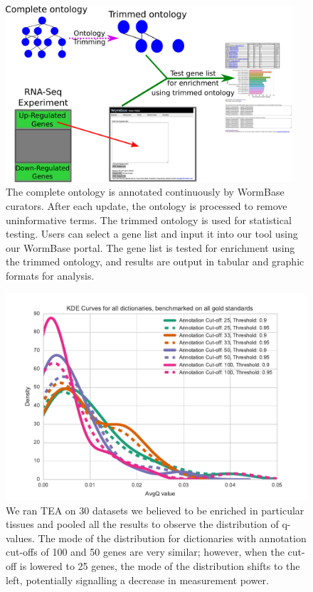 \documentclass{bmcart}
\begin{document}
\begin{backmatter}
\begin{figure}
	\centering
	\includegraphics[width=0.95\textwidth]{figures/workflow.pdf}
	\captionsetup{width= 0.95\textwidth}
	\caption{
	The complete ontology is annotated continuously by WormBase curators. After each update, the ontology is processed to remove uninformative terms. The trimmed ontology is used for statistical testing. 
	Users can select a gene list and input it into our tool using our WormBase portal. The gene list is tested for enrichment using the trimmed ontology, and results are output in tabular and graphic formats for analysis. 
	}
	\label{fig:workflow}
\end{figure}


\begin{figure}[h!]
	\includegraphics[width=\textwidth]{avgQKDE_method=any.pdf}
  \captionsetup{width= 0.95\textwidth}
  \caption{
      We ran TEA on 30 datasets we believed to be enriched in particular tissues and pooled all the results to observe the distribution of q-values. The mode of the distribution for dictionaries with annotation cut-offs of 100 and 50 genes are very similar; however, when the cut-off is lowered to 25 genes, the mode of the distribution shifts to the left, potentially signalling a decrease in measurement power.
	  }
	  \label{fig:qvals}
\end{figure}




\end{backmatter}
\end{document}
